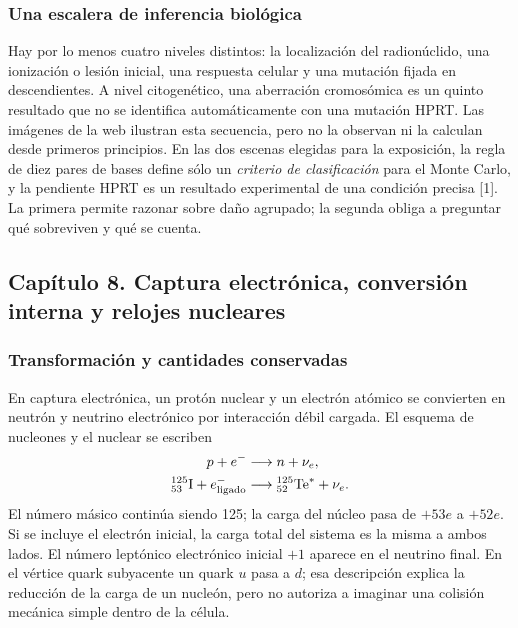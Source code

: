 \documentclass[11pt,a4paper,oneside]{article}
\begin{document}
\subsubsection{Una escalera de inferencia biológica}
Hay por lo menos cuatro niveles distintos: la localización del radionúclido,
una ionización o lesión inicial, una respuesta celular y una mutación fijada
en descendientes. A nivel citogenético, una aberración cromosómica es un
quinto resultado que no se identifica automáticamente con una mutación HPRT.
Las imágenes de la web ilustran esta secuencia, pero no la observan ni la
calculan desde primeros principios. En las dos escenas elegidas para la
exposición, la regla de diez pares de bases define sólo un \emph{criterio de
clasificación} para el Monte Carlo, y la pendiente HPRT es un resultado
experimental de una condición precisa [1]. La primera permite razonar sobre
daño agrupado; la segunda obliga a preguntar qué sobreviven y qué se cuenta.

\clearpage
\subsection{Capítulo 8. Captura electrónica, conversión interna y relojes nucleares}
\label{ampliacion-captura}

\subsubsection{Transformación y cantidades conservadas}
En captura electrónica, un protón nuclear y un electrón atómico se convierten
en neutrón y neutrino electrónico por interacción débil cargada. El esquema
de nucleones y el nuclear se escriben
\begin{align}
p+e^-&\longrightarrow n+\nu_e,\\
{}^{125}_{53}\mathrm I+e^-_{\rm ligado}
 &\longrightarrow{}^{125}_{52}\mathrm{Te}^{*}+\nu_e.
\end{align}
El número másico continúa siendo 125; la carga del núcleo pasa de $+53e$ a
$+52e$. Si se incluye el electrón inicial, la carga total del sistema es la
misma a ambos lados. El número leptónico electrónico inicial $+1$ aparece en
el neutrino final. En el vértice quark subyacente un quark $u$ pasa a $d$;
esa descripción explica la reducción de la carga de un nucleón, pero no
autoriza a imaginar una colisión mecánica simple dentro de la célula.
\end{document}
